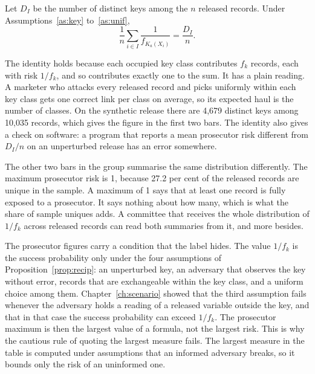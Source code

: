\begin{proposition}\label{c03:prop-ident}
Let $D_I$ be the number of distinct keys among the $n$ released records. Under
Assumptions~\ref{as:key} to~\ref{as:unif},
\begin{equation}\label{c03:eq-ident}
\frac{1}{n}\sum_{i \in I}\frac{1}{f_{K_a(X_i)}} = \frac{D_I}{n}.
\end{equation}
\end{proposition}

The identity holds because each occupied key class contributes $f_k$ records, each with
risk $1/f_k$, and so contributes exactly one to the sum. It has a plain reading. A
marketer who attacks every released record and picks uniformly within each key class
gets one correct link per class on average, so its expected haul is the number of
classes. On the synthetic release there are 4,679 distinct keys among 10,035 records,
which gives the figure in the first two bars. The identity also gives a check on
software: a program that reports a mean prosecutor risk different from $D_I/n$ on an
unperturbed release has an error somewhere.

The other two bars in the group summarise the same distribution differently. The
maximum prosecutor risk is 1, because 27.2 per cent of the released records are unique
in the sample.
A maximum of 1 says that at least one record is fully exposed to a prosecutor. It says nothing about how many, which is what the share of sample uniques adds. A
committee that receives the whole distribution of $1/f_k$ across released records can
read both summaries from it, and more besides.

The prosecutor figures carry a condition that the label hides. The value $1/f_k$ is the
success probability only under the four assumptions of Proposition~\ref{prop:recip}:
an unperturbed key, an adversary that observes the key without error, records that are
exchangeable within the key class, and a uniform choice among them. Chapter~\ref{ch:scenario} showed that the third assumption fails whenever the adversary holds a reading of a released
variable outside the key, and that in that case the success probability can exceed
$1/f_k$. The prosecutor maximum is then the largest value of a formula, not the largest
risk. This is why the cautious rule of quoting the largest measure fails. The largest
measure in the table is computed under assumptions that an informed adversary breaks,
so it bounds only the risk of an uninformed one.

